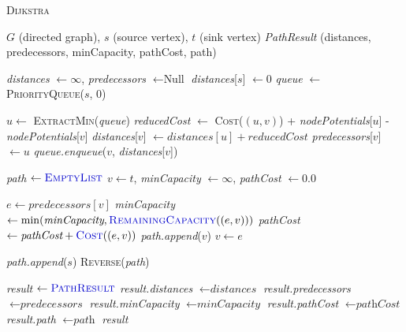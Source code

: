 \documentclass{article}
\begin{document}
\begin{algorithm}[H]
\caption{\textcolor{keywordcolor}{\textsc{Dijkstra}}}
\begin{algorithmic}[1]
\State {} $G$ (directed graph), $s$ (source vertex), $t$ (sink vertex)
\State {} \textit{PathResult} (distances, predecessors, minCapacity, pathCost, path)

\State \textit{distances} $\gets \infty$, \textit{predecessors} $\gets \text{Null}$
\State \textit{distances}[$s$] $\gets 0$
\State \textit{queue} $\gets$ \textcolor{identifiercolor}{\textsc{PriorityQueue}}($s$, $0$)

    \State $u \gets$ \textcolor{identifiercolor}{\textsc{ExtractMin}}(\textit{queue})
            \State \textit{reducedCost} $\gets$ \textcolor{identifiercolor}{\textsc{Cost}}($(u, v)$) + \textit{nodePotentials}[$u$] - \textit{nodePotentials}[$v$]
                \State \textit{distances}[$v$] $\gets \textit{distances}[u] + \textit{reducedCost}$
                \State \textit{predecessors}[$v$] $\gets u$
                \State \textit{queue.enqueue}($v$, \textit{distances}[$v$])
            \EndIf
        \EndIf
    \EndFor
\EndWhile

\State \textit{path} $\gets \textcolor{identifiercolor}{\textsc{EmptyList}}$
\State $v \gets t$, \textit{minCapacity} $\gets \infty$, \textit{pathCost} $\gets 0.0$

    \State $e \gets \textit{predecessors}[v]$
    \State \textit{minCapacity} $\gets \min(\textit{minCapacity}, \textcolor{identifiercolor}{\textsc{RemainingCapacity}}((e, v)))$
    \State \textit{pathCost} $\gets \textit{pathCost} + \textcolor{identifiercolor}{\textsc{Cost}}((e, v))$
    \State \textit{path.append}($v$)
    \State $v \gets e$
\EndWhile

\State \textit{path.append}($s$)
\State \textcolor{identifiercolor}{\textsc{Reverse}}(\textit{path})

\State \textit{result} $\gets \textcolor{identifiercolor}{\textsc{PathResult}}$
\State \textit{result.distances} $\gets \textit{distances}$
\State \textit{result.predecessors} $\gets \textit{predecessors}$
\State \textit{result.minCapacity} $\gets \textit{minCapacity}$
\State \textit{result.pathCost} $\gets \textit{pathCost}$
\State \textit{result.path} $\gets \textit{path}$
\State \Return \textit{result}
\end{algorithmic}
\end{algorithm}
\end{document}
